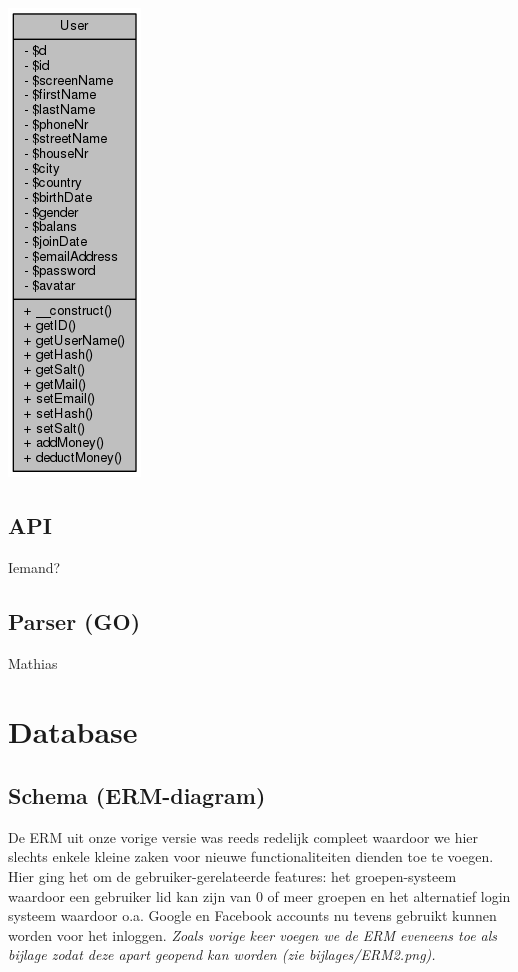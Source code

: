 \documentclass[11pt]{article}
\begin{document}
\includegraphics[scale=0.4]{UML_User.png}

\subsection{API}

Iemand?


\subsection{Parser (GO)}

Mathias




\section{Database}

\subsection{Schema (ERM-diagram)}

De ERM uit onze vorige versie was reeds redelijk compleet waardoor we hier slechts enkele kleine zaken voor nieuwe functionaliteiten dienden toe te voegen.\\
Hier ging het om de gebruiker-gerelateerde features: het groepen-systeem waardoor een gebruiker lid kan zijn van 0 of meer groepen en het alternatief login systeem waardoor o.a. Google en Facebook accounts nu tevens gebruikt kunnen worden voor het inloggen.  \emph{Zoals vorige keer voegen we de ERM eveneens toe als bijlage zodat deze apart geopend kan worden (zie bijlages/ERM2.png).}
\end{document}
